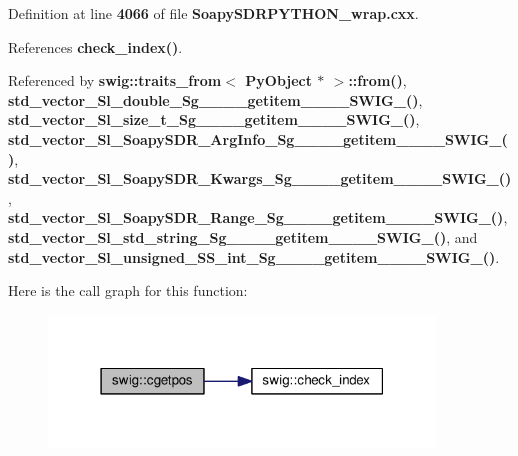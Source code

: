 Definition at line {\bf 4066} of file {\bf Soapy\+S\+D\+R\+P\+Y\+T\+H\+O\+N\+\_\+wrap.\+cxx}.



References {\bf check\+\_\+index()}.



Referenced by {\bf swig\+::traits\+\_\+from$<$ Py\+Object $\ast$ $>$\+::from()}, {\bf std\+\_\+vector\+\_\+\+Sl\+\_\+double\+\_\+\+Sg\+\_\+\+\_\+\+\_\+\+\_\+getitem\+\_\+\+\_\+\+\_\+\+\_\+\+S\+W\+I\+G\+\_()}, {\bf std\+\_\+vector\+\_\+\+Sl\+\_\+size\+\_\+t\+\_\+\+Sg\+\_\+\+\_\+\+\_\+\+\_\+getitem\+\_\+\+\_\+\+\_\+\+\_\+\+S\+W\+I\+G\+\_()}, {\bf std\+\_\+vector\+\_\+\+Sl\+\_\+\+Soapy\+S\+D\+R\+\_\+\+Arg\+Info\+\_\+\+Sg\+\_\+\+\_\+\+\_\+\+\_\+getitem\+\_\+\+\_\+\+\_\+\+\_\+\+S\+W\+I\+G\+\_()}, {\bf std\+\_\+vector\+\_\+\+Sl\+\_\+\+Soapy\+S\+D\+R\+\_\+\+Kwargs\+\_\+\+Sg\+\_\+\+\_\+\+\_\+\+\_\+getitem\+\_\+\+\_\+\+\_\+\+\_\+\+S\+W\+I\+G\+\_()}, {\bf std\+\_\+vector\+\_\+\+Sl\+\_\+\+Soapy\+S\+D\+R\+\_\+\+Range\+\_\+\+Sg\+\_\+\+\_\+\+\_\+\+\_\+getitem\+\_\+\+\_\+\+\_\+\+\_\+\+S\+W\+I\+G\+\_()}, {\bf std\+\_\+vector\+\_\+\+Sl\+\_\+std\+\_\+string\+\_\+\+Sg\+\_\+\+\_\+\+\_\+\+\_\+getitem\+\_\+\+\_\+\+\_\+\+\_\+\+S\+W\+I\+G\+\_()}, and {\bf std\+\_\+vector\+\_\+\+Sl\+\_\+unsigned\+\_\+\+S\+S\+\_\+int\+\_\+\+Sg\+\_\+\+\_\+\+\_\+\+\_\+getitem\+\_\+\+\_\+\+\_\+\+\_\+\+S\+W\+I\+G\+\_()}.



Here is the call graph for this function\+:
\nopagebreak
\begin{figure}[H]
\begin{center}
\leavevmode
\includegraphics[width=291pt]{d3/d99/namespaceswig_a3e4de99498e78ee45e114f32a533f42e_cgraph}
\end{center}
\end{figure}





